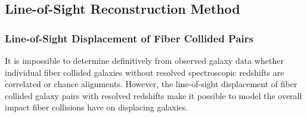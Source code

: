                                                                                                                                                             \subsection{Line-of-Sight Reconstruction Method} \label{sec:dlospeak}
                                                                                                                                                            \subsubsection{Line-of-Sight Displacement of Fiber Collided Pairs} \label{sec:dlos}
                                                                                                                                                            It is impossible to determine definitively from observed galaxy data whether 
                                                                                                                                                            individual fiber collided galaxies without resolved spectroscopic redshifts 
                                                                                                                                                            are correlated or chance alignments. However, the line-of-sight displacement of 
                                                                                                                                                            fiber collided galaxy pairs with resolved redshifts make it possible to model 
                                                                                                                                                            the overall impact fiber collisions have on displacing galaxies.

